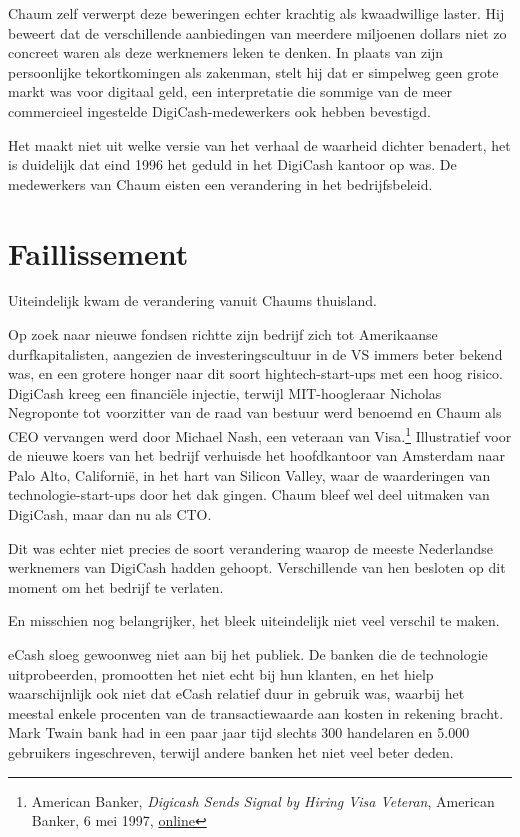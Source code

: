 \documentclass[
  a5paper,
  smalldemyvopaper,11pt,twoside,onecolumn,openright,extrafontsizes,
hidelinks]{memoir}
\begin{document}
Chaum zelf verwerpt deze beweringen echter krachtig als kwaadwillige
laster. Hij beweert dat de verschillende aanbiedingen van meerdere
miljoenen dollars niet zo concreet waren als deze werknemers leken te
denken. In plaats van zijn persoonlijke tekortkomingen als zakenman,
stelt hij dat er simpelweg geen grote markt was voor digitaal geld, een
interpretatie die sommige van de meer commercieel ingestelde
DigiCash-medewerkers ook hebben bevestigd.

Het maakt niet uit welke versie van het verhaal de waarheid dichter
benadert, het is duidelijk dat eind 1996 het geduld in het DigiCash
kantoor op was. De medewerkers van Chaum eisten een verandering in het
bedrijfsbeleid.

\section{Faillissement}\label{faillissement}

Uiteindelijk kwam de verandering vanuit Chaums thuisland.

Op zoek naar nieuwe fondsen richtte zijn bedrijf zich tot Amerikaanse
durfkapitalisten, aangezien de investeringscultuur in de VS immers beter
bekend was, en een grotere honger naar dit soort hightech-start-ups met
een hoog risico. DigiCash kreeg een financiële injectie, terwijl
MIT-hoogleraar Nicholas Negroponte tot voorzitter van de raad van
bestuur werd benoemd en Chaum als CEO vervangen werd door Michael Nash,
een veteraan van Visa.\footnote{American Banker, \emph{Digicash Sends
  Signal by Hiring Visa Veteran}, American Banker, 6 mei 1997,
  \href{https://www.americanbanker.com/news/digicash-sends-signal-by-hiring-visa-veteran}{online}}
Illustratief voor de nieuwe koers van het bedrijf verhuisde het
hoofdkantoor van Amsterdam naar Palo Alto, Californië, in het hart van
Silicon Valley, waar de waarderingen van technologie-start-ups door het
dak gingen. Chaum bleef wel deel uitmaken van DigiCash, maar dan nu als
CTO.

Dit was echter niet precies de soort verandering waarop de meeste
Nederlandse werknemers van DigiCash hadden gehoopt. Verschillende van
hen besloten op dit moment om het bedrijf te verlaten.

En misschien nog belangrijker, het bleek uiteindelijk niet veel verschil
te maken.

eCash sloeg gewoonweg niet aan bij het publiek. De banken die de
technologie uitprobeerden, promootten het niet echt bij hun klanten, en
het hielp waarschijnlijk ook niet dat eCash relatief duur in gebruik
was, waarbij het meestal enkele procenten van de transactiewaarde aan
kosten in rekening bracht. Mark Twain bank had in een paar jaar tijd
slechts 300 handelaren en 5.000 gebruikers ingeschreven, terwijl andere
banken het niet veel beter deden.
\end{document}
